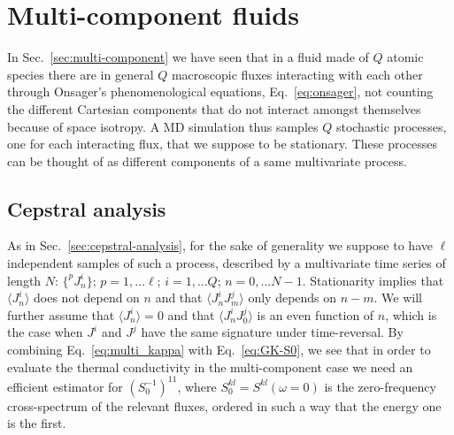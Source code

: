 \section{Multi-component fluids}  \label{sec:data-analysis-multicomponent}
In Sec.~\ref{sec:multi-component} we have seen that in a fluid made of $Q$ atomic species there are in general $Q$ macroscopic fluxes interacting with each other through Onsager's phenomenological equations, Eq.~\eqref{eq:onsager}, not counting the different Cartesian components that do not interact amongst themselves because of space isotropy. A MD simulation thus samples $Q$ stochastic processes, one for each interacting flux, that we suppose to be stationary. These processes can be thought of as different components of a same multivariate process. 

\subsection{Cepstral analysis}  \label{sec:cepstral-multicomponent}
As in Sec.~\ref{sec:cepstral-analysis}, for the sake of generality we suppose to have $\ell$ independent samples of such a process, described by a multivariate time series of length $N$: $\{ ^{p\!}{J}^i_n \}$; $p=1,\dots \ell$; $i=1,\dots Q$; $n=0,\dots N-1$. Stationarity implies that $\langle {J}^i_n\rangle $ does not depend on $n$ and that $\langle {J}^i_n {J}^j_m \rangle$ only depends on $n-m$. We will further assume that $\langle {J}^i_n\rangle =0 $ and that $\langle {J}^i_n {J}^j_0 \rangle$ is an even function of $n$, which is the case when ${J}^i$ and ${J}^j$ have the same signature under time-reversal. By combining Eq.~\eqref{eq:multi_kappa} with Eq.~\eqref{eq:GK-S0}, we see that in order to evaluate the thermal conductivity in the multi-component case we need an efficient estimator for $\left ( S^{-1}_0\right )^{11}$, where $S^{kl}_0=S^{kl}(\omega=0)$ is the zero-frequency cross-spectrum of the relevant fluxes, ordered in  such a way that the energy one is the first.

